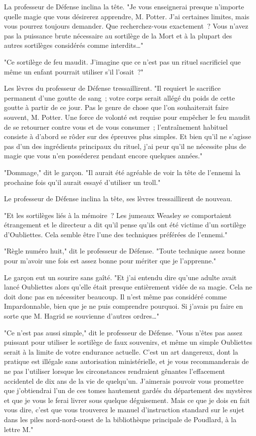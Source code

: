 La professeur de Défense inclina la tête. "Je vous enseignerai presque n'importe quelle magie que vous désirerez apprendre, M. Potter. J'ai certaines limites, mais vous pourrez toujours demander. Que recherchez-vous exactement~? Vous n'avez pas la puissance brute nécessaire au sortilège de la Mort et à la plupart des autres sortilèges considérés comme interdits…"

"Ce sortilège de feu maudit. J'imagine que ce n'est pas un rituel sacrificiel que même un enfant pourrait utiliser s'il l'osait~?"

Les lèvres du professeur de Défense tressaillirent. "Il requiert le sacrifice permanent d'une goutte de sang~; votre corps serait allégé du poids de cette goutte à partir de ce jour. Pas le genre de chose que l'on souhaiterait faire souvent, M. Potter. Une force de volonté est requise pour empêcher le feu maudit de se retourner contre vous et de vous consumer~; l'entraînement habituel consiste à d'abord se rôder sur des épreuves plus simples. Et bien qu'il ne s'agisse pas d'un des ingrédients principaux du rituel, j'ai peur qu'il ne nécessite plus de magie que vous n'en posséderez pendant encore quelques années."

"Dommage," dit le garçon. "Il aurait été agréable de voir la tête de l'ennemi la prochaine fois qu'il aurait essayé d'utiliser un troll."

Le professeur de Défense inclina la tête, ses lèvres tressaillirent de nouveau.

"Et les sortilèges liés à la mémoire~? Les jumeaux Weasley se comportaient étrangement et le directeur a dit qu'il pense qu'ils ont été victime d'un sortilège d'Oubliettes. Cela semble être l'une des techniques préférées de l'ennemi."

"Règle numéro huit," dit le professeur de Défense. "Toute technique assez bonne pour m'avoir une fois est assez bonne pour mériter que je l'apprenne."

Le garçon eut un sourire sans gaîté. "Et j'ai entendu dire qu'une adulte avait lancé Oubliettes alors qu'elle était presque entièrement vidée de sa magie. Cela ne doit donc pas en nécessiter beaucoup. Il n'est même pas considéré comme Impardonnable, bien que je ne puis comprendre pourquoi. Si j'avais pu faire en sorte que M. Hagrid se souvienne d'autres ordres…"

"Ce n'est pas aussi simple," dit le professeur de Défense. "Vous n'êtes pas assez puissant pour utiliser le sortilège de faux souvenirs, et même un simple Oubliettes serait à la limite de votre endurance actuelle. C'est un art dangereux, dont la pratique est illégale sans autorisation ministérielle, et je vous recommanderais de ne pas l'utiliser lorsque les circonstances rendraient gênantes l'effacement accidentel de dix ans de la vie de quelqu'un. J'aimerais pouvoir vous promettre que j'obtiendrai l'un de ces tomes hautement gardés du département des mystères et que je vous le ferai livrer sous quelque déguisement. Mais ce que je dois en fait vous dire, c'est que vous trouverez le manuel d'instruction standard sur le sujet dans les piles nord-nord-ouest de la bibliothèque principale de Poudlard, à la lettre M."

